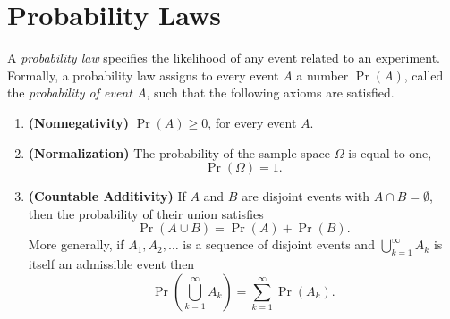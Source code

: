 \section{Probability Laws}
\label{section:ProbabilityLaws}

A \emph{probability law} specifies the likelihood of any event related to an experiment.
Formally, a probability law assigns to every event $A$ a number $\Pr (A)$, called the \emph{probability of event $A$}, such that the following axioms are satisfied.
\begin{enumerate}
\item \textbf{(Nonnegativity)} $\Pr (A) \geq 0$, for every event $A$.
\item \textbf{(Normalization)} The probability of the sample space $\Omega$ is equal to one,
\begin{equation*}
\Pr (\Omega) = 1 .
\end{equation*}
\item \textbf{(Countable Additivity)} If $A$ and $B$ are disjoint events with $A \cap B = \emptyset$, then the probability of their union satisfies
\begin{equation*}
\Pr (A \cup B) = \Pr (A) + \Pr (B) .
\end{equation*}
More generally, if $A_1, A_2, \ldots$ is a sequence of disjoint events and $\bigcup_{k=1}^{\infty} A_k$ is itself an admissible event then
\begin{equation*}
\Pr \left( \bigcup_{k=1}^{\infty} A_k \right)
= \sum_{k = 1}^{\infty} \Pr (A_k) .
\end{equation*}
\end{enumerate}

